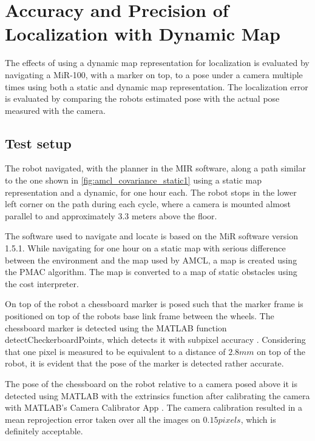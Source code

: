 \section{Accuracy and Precision of Localization with Dynamic Map}
The effects of using a dynamic map representation for localization is evaluated by navigating a MiR-100, with a marker on top, to a pose under a camera multiple times using both a static and dynamic map representation.
The localization error is evaluated by comparing the robots estimated pose with the actual pose measured with the camera. 
\subsection{Test setup} 
The robot navigated, with the planner in the MIR software, along a path similar to the one shown in \ref{fig:amcl_covariance_static1} using a static map representation and a dynamic, for one hour each.
The robot stops in the lower left corner on the path during each cycle, where a camera is mounted almost parallel to and approximately $3.3$ meters above the floor.

The software used to navigate and locate is based on the MiR software version 1.5.1. 
While navigating for one hour on a static map with serious difference between the environment and the map used by AMCL, a map is created using the PMAC algorithm.
The map is converted to a map of static obstacles using the cost interpreter.

On top of the robot a chessboard marker is posed such that the marker frame is positioned on top of the robots base link frame between the wheels.
The chessboard marker is detected using the MATLAB function detectCheckerboardPoints, which detects it with subpixel accuracy \cite{matlab_detect_checkerboard}.
Considering that one pixel is measured to be equivalent to a distance of $2.8mm$ on top of the robot, it is evident that the pose of the marker is detected rather accurate.

The pose of the chessboard on the robot relative to a camera posed above it is detected using MATLAB with the extrinsics function \cite{matlab_extrinsics} after calibrating the camera with MATLAB's Camera Calibrator App  \cite{camera_calibrator_app}. 
The camera calibration resulted in a mean reprojection error taken over all the images on $0.15pixels$, which is definitely acceptable.

